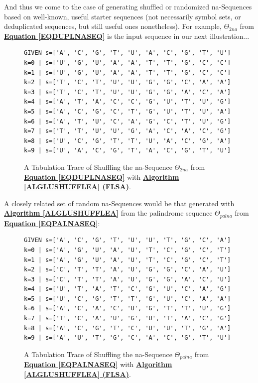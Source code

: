 \documentclass[a4paper, 18pt]{book} %
\begin{document}
And thus we come to the case of generating shuffled or randomized na-Sequences based on well-known, useful starter sequences (not necessarily symbol sets, or deduplicated sequences, but still useful ones nonetheless). For example, $\Theta_{2na}$ from \textbf{\hyperref[EQDUPLNASEQ]{Equation \ref{EQDUPLNASEQ}}} is the input sequence in our next illustration...

\begin{figure}[H]
  \begin{center}
\Large
\begin{verbatim}
GIVEN s=['A', 'C', 'G', 'T', 'U', 'A', 'C', 'G', 'T', 'U']
k=0 | s=['U', 'G', 'U', 'A', 'A', 'T', 'T', 'G', 'C', 'C']
k=1 | s=['U', 'G', 'U', 'A', 'A', 'T', 'T', 'G', 'C', 'C']
k=2 | s=['T', 'C', 'T', 'U', 'U', 'G', 'G', 'C', 'A', 'A']
k=3 | s=['T', 'C', 'T', 'U', 'U', 'G', 'G', 'A', 'C', 'A']
k=4 | s=['A', 'T', 'A', 'C', 'C', 'G', 'U', 'T', 'U', 'G']
k=5 | s=['A', 'C', 'G', 'C', 'T', 'G', 'U', 'T', 'U', 'A']
k=6 | s=['A', 'T', 'U', 'C', 'A', 'G', 'C', 'T', 'U', 'G']
k=7 | s=['T', 'T', 'U', 'U', 'G', 'A', 'C', 'A', 'C', 'G']
k=8 | s=['U', 'C', 'G', 'T', 'T', 'U', 'A', 'C', 'G', 'A']
k=9 | s=['U', 'A', 'C', 'G', 'T', 'A', 'C', 'G', 'T', 'U']
\end{verbatim}

   \caption{A Tabulation Trace of Shuffling the na-Sequence $\Theta_{2na}$ from \textbf{\hyperref[EQDUPLNASEQ]{Equation \ref{EQDUPLNASEQ}}} with \textbf{\hyperref[ALGLUSHUFFLEA]{Algorithm \ref{ALGLUSHUFFLEA} (FLSA)}}.}
  \label{FIGTRACEFLSA2NA}
  \end{center}
\end{figure}

A closely related set of random na-Sequences would be that generated with \textbf{\hyperref[ALGLUSHUFFLEA]{Algorithm \ref{ALGLUSHUFFLEA}}} from the palindrome sequence $\Theta_{palna}$ from \textbf{\hyperref[EQPALNASEQ]{Equation \ref{EQPALNASEQ}}}:


\begin{figure}[H]
  \begin{center}
\Large
\begin{verbatim}
GIVEN s=['A', 'C', 'G', 'T', 'U', 'U', 'T', 'G', 'C', 'A']
k=0 | s=['A', 'G', 'U', 'A', 'U', 'T', 'C', 'G', 'C', 'T']
k=1 | s=['A', 'G', 'U', 'A', 'U', 'T', 'C', 'G', 'C', 'T']
k=2 | s=['C', 'T', 'T', 'A', 'U', 'G', 'G', 'C', 'A', 'U']
k=3 | s=['C', 'T', 'T', 'A', 'U', 'G', 'G', 'A', 'C', 'U']
k=4 | s=['U', 'T', 'A', 'T', 'C', 'G', 'U', 'C', 'A', 'G']
k=5 | s=['U', 'C', 'G', 'T', 'T', 'G', 'U', 'C', 'A', 'A']
k=6 | s=['A', 'C', 'A', 'C', 'U', 'G', 'T', 'T', 'U', 'G']
k=7 | s=['T', 'C', 'A', 'U', 'G', 'U', 'T', 'A', 'C', 'G']
k=8 | s=['A', 'C', 'G', 'T', 'C', 'U', 'U', 'T', 'G', 'A']
k=9 | s=['A', 'U', 'T', 'G', 'C', 'A', 'C', 'G', 'T', 'U']
\end{verbatim}

   \caption{A Tabulation Trace of Shuffling the na-Sequence $\Theta_{palna}$ from \textbf{\hyperref[EQPALNASEQ]{Equation \ref{EQPALNASEQ}}} with \textbf{\hyperref[ALGLUSHUFFLEA]{Algorithm \ref{ALGLUSHUFFLEA} (FLSA)}}.}
  \label{FIGTRACEFLSAPALNA}
  \end{center}
\end{figure}
\end{document}
